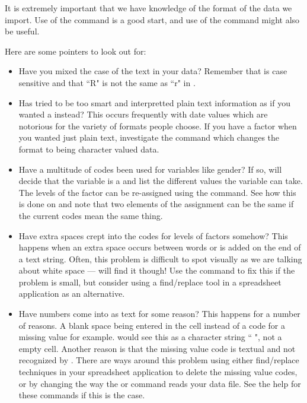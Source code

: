 It is extremely important that we have knowledge of the format of the data we import. Use of the  command is a good start, and use of the  command might also be useful.

Here are some pointers to look out for:\begin{itemize}

\item Have you mixed the case of the text in your data? Remember that \R{} is case sensitive and that ``R" is not the same as ``r" in \R{}.

\item Has \R{} tried to be too smart and interpretted plain text information as if you wanted a  instead? This occurs frequently with date values which are notorious for the variety of formats people choose. If you have a factor when you wanted just plain text, investigate the  command which changes the format to being character valued data.
\item Have a multitude of codes been used for variables like gender? If so, \R{} will decide that the variable is a  and list the different values the variable can take. The levels of the factor can be re-assigned using the  command. See how this is done on \pageref{UseOfLevels} and note that two elements of the assignment can be the same if the current codes mean the same thing.
\item Have extra spaces crept into the codes for levels of factors somehow? This happens when an extra space occurs between words or is added on the end of a text string. Often, this problem is difficult to spot visually as we are talking about white space --- \R{} will find it though! Use the  command to fix this if the problem is small, but consider using a find/replace tool in a spreadsheet application as an alternative.
\item Have numbers come into \R{} as text for some reason? This happens for a number of reasons. A blank space being entered in the cell instead of a code for a missing value for example. \R{} would see this as a character string `` ", not a empty cell. Another reason is that the missing value code is textual and not recognized by \R{}. There are ways around this problem using either find/replace techniques in your spreadsheet application to delete the missing value codes, or by changing the way the  or  command reads your data file. See the help for these commands if this is the case.
\end{itemize}






